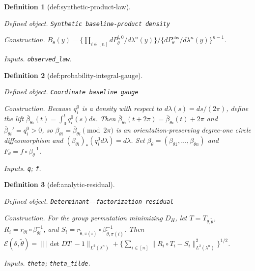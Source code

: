 \documentclass{article}
\newtheorem{definition}{Definition}
\begin{document}
\begin{definition}[def:synthetic-product-law]\label{def:synthetic-product-law}
\par\smallskip\noindent\emph{Defined object.} \texttt{Synthetic baseline-\allowbreak{}product density}
\par\smallskip\noindent\emph{Construction.} \(B_\theta(y)=\bigl\{\prod_{i\in[n]}dP_\theta^{i,0}/d\lambda^n(y)\bigr\}\big/\bigl\{dP_\theta^{\mathrm{obs}}/d\lambda^n(y)\bigr\}^{n-1}\).
\par\smallskip\noindent\emph{Inputs.} \texttt{observed\_\allowbreak{}law}.
\end{definition}

\begin{definition}[def:probability-integral-gauge]\label{def:probability-integral-gauge}
\par\smallskip\noindent\emph{Defined object.} \texttt{Coordinate baseline gauge}
\par\smallskip\noindent\emph{Construction.} Because \(q_i^0\) is a density with respect to \(d\lambda(s)=ds/(2\pi)\), define the lift \(\overline\beta_{\theta i}(t)=\int_0^tq_i^0(s)ds\). Then \(\overline\beta_{\theta i}(t+2\pi)=\overline\beta_{\theta i}(t)+2\pi\) and \(\overline\beta_{\theta i}'=q_i^0>0\), so \(\beta_{\theta i}=\overline\beta_{\theta i}\pmod{2\pi}\) is an orientation-preserving degree-one circle diffeomorphism and \((\beta_{\theta i})_*(q_i^0d\lambda)=d\lambda\). Set \(\beta_\theta=(\beta_{\theta1},\ldots,\beta_{\theta n})\) and \(F_\theta=f\circ\beta_\theta^{-1}\).
\par\smallskip\noindent\emph{Inputs.} \texttt{q}; \texttt{f}.
\end{definition}

\begin{definition}[def:analytic-residual]\label{def:analytic-residual}
\par\smallskip\noindent\emph{Defined object.} \texttt{Determinant-\allowbreak{}-\allowbreak{}factorization residual}
\par\smallskip\noindent\emph{Construction.} For the group permutation minimizing \(D_H\), let \(T=T_{\theta,\widetilde\theta}\), \(R_i=r_{\theta i}\circ\beta_{\theta i}^{-1}\), and \(S_i=r_{\widetilde\theta,\pi(i)}\circ\beta_{\widetilde\theta,\pi(i)}^{-1}\). Then \(\mathcal E(\theta,\widetilde\theta)=\lVert|\det DT|-1\rVert_{L^2(\lambda^n)}+\{\sum_{i\in[n]}\lVert R_i\circ T_i-S_i\rVert_{L^2(\lambda^n)}^2\}^{1/2}\).
\par\smallskip\noindent\emph{Inputs.} \texttt{theta}; \texttt{theta\_\allowbreak{}tilde}.
\end{definition}
\end{document}

